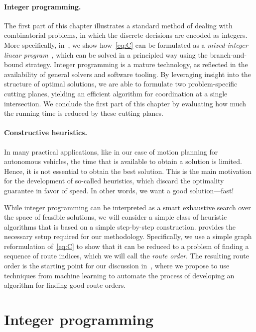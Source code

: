 \documentclass{report}
\theoremstyle{definition}
\theoremstyle{plain}
\begin{document}
\paragraph{Integer programming.}
The first part of this chapter illustrates a standard method of dealing with
combinatorial problems, in which the discrete decisions are encoded as integers.
More specifically, in~, we show how~\eqref{eq:C} can be
formulated as a \emph{mixed-integer linear
  program}~\cite{confortiIntegerProgramming2014}, which can be solved in a
principled way using the branch-and-bound strategy. Integer programming is a
mature technology, as reflected in the availability of general solvers and
software tooling.
%
By leveraging insight into the structure of optimal solutions, we are able to
formulate two problem-specific cutting planes, yielding an efficient
algorithm for coordination at a single intersection.
%
We conclude the first part of this chapter by evaluating how much the running
time is reduced by these cutting planes.

\paragraph{Constructive heuristics.}
In many practical applications, like in our case of motion planning for
autonomous vehicles, the time that is available to obtain a solution is
limited. Hence, it is not essential to obtain the best solution. This is the
main motivation for the development of so-called heuristics, which discard the
optimality guarantee in favor of speed. In other words, we want a good
solution---fast!

While integer programming can be interpreted as a smart exhaustive search over
the space of feasible solutions, we will consider a simple class of heuristic
algorithms that is based on a simple step-by-step construction.
%
 provides the necessary setup required for our
methodology.
%
Specifically, we use a simple graph reformulation of~\eqref{eq:C} to show that
it can be reduced to a problem of finding a sequence of route indices, which we
will call the \emph{route order}. The resulting route order is the starting
point for our discussion in~, where we propose to use
techniques from machine learning to automate the process of developing an
algorithm for finding good route orders.


\section{Integer programming}\label{sec:branch-and-bound}
\end{document}
